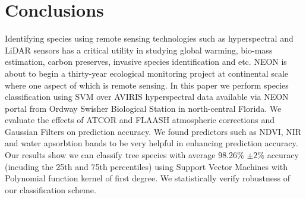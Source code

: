 \documentclass[remotesensing,article,accept,moreauthors,pdftex,12pt,a4paper]{mdpi}
\begin{document}




\section{Conclusions}

Identifying species using remote sensing technologies such as hyperspectral and LiDAR sensors has a critical utility in studying global warming, bio-mass estimation, carbon preserves, invasive species identification and etc. NEON is about to begin a thirty-year ecological monitoring project at continental scale where one aspect of which is remote sensing. In this paper we perform species classification using SVM over AVIRIS hyperspectral data available via NEON portal from Ordway Swisher Biological Station in north-central Florida. We evaluate the effects of ATCOR and FLAASH atmospheric corrections and Gaussian Filters on prediction accuracy. We found predictors such as NDVI, NIR and water apsorbtion bands to be very helpful in enhancing prediction accuracy. Our results show we can classify tree species with average 98.26\% $\pm 2\%$ accuracy (incuding the 25th and 75th percentiles)  using Support Vector Machines with Polynomial function kernel of first degree. We statistically verify robustness of our classification scheme.











\end{document}
